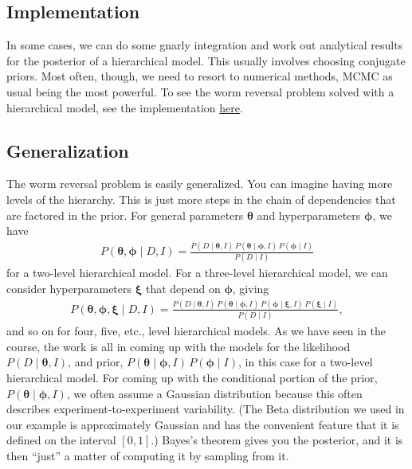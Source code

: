 \subsection{Implementation}
In some cases, we can do some gnarly integration and work out
analytical results for the posterior of a hierarchical model.  This
usually involves choosing conjugate priors.  Most often, though, we
need to resort to numerical methods, MCMC as usual being the most powerful.  To see the worm reversal problem
solved with a hierarchical model, see the implementation
\href{http://bebi103.caltech.edu/2016/lecture_notes/l08_hierarchical_models.html}{here}.


\subsection{Generalization}
The worm reversal problem is easily generalized.  You can imagine
having more levels of the hierarchy.  This is just more steps in the
chain of dependencies that are factored in the prior.  For general
parameters $\boldsymbol{\theta}$ and hyperparameters
$\boldsymbol{\phi}$, we have
\begin{align}
P(\boldsymbol{\theta}, \boldsymbol{\phi} \mid D, I) = \frac{P(D\mid \boldsymbol{\theta}, I)\, P(\boldsymbol{\theta} \mid \boldsymbol{\phi}, I)\,P(\boldsymbol{\phi}\mid I)}
{P(D\mid I)}
\end{align}
for a two-level hierarchical model. For a three-level hierarchical model, we can consider hyperparameters $\boldsymbol{\xi}$ that depend on $\boldsymbol{\phi}$, giving
\begin{align}
P(\boldsymbol{\theta}, \boldsymbol{\phi}, \boldsymbol{\xi} \mid D, I) = \frac{P(D\mid \boldsymbol{\theta}, I)\, P(\boldsymbol{\theta} \mid \boldsymbol{\phi}, I)\,P(\boldsymbol{\phi}\mid \boldsymbol{\xi}, I)\,P(\boldsymbol{\xi}\mid I)}
{P(D\mid I)},
\end{align}
and so on for four, five, etc., level hierarchical models. As we have seen in the course,
the work is all in coming up with the models for the likelihood
$P(D\mid \boldsymbol{\theta}, I)$, and prior,
$P(\boldsymbol{\theta} \mid \boldsymbol{\phi},
I)\,P(\boldsymbol{\phi}\mid I)$, in this case for a two-level hierarchical model.
For coming up with the conditional portion of the prior,
$P(\boldsymbol{\theta} \mid \boldsymbol{\phi}, I)$, we often assume a
Gaussian distribution because this often describes
experiment-to-experiment variability. (The Beta distribution we used in our example is approximately Gaussian and has the convenient feature that it is defined on the interval $[0,1]$.)  Bayes's theorem gives you the
posterior, and it is then ``just'' a matter of computing it by
sampling from it.
